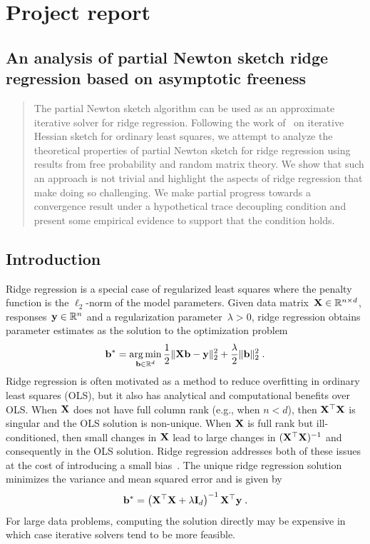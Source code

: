 

\section{Project report}

\subsection*{\centering An analysis of partial Newton sketch ridge regression based on asymptotic freeness}
\vspace{1em}

\begin{abstract}
The partial Newton sketch algorithm can be used as an approximate iterative solver for ridge regression. Following the work of~\citet{Lacotte:2020} on iterative Hessian sketch for ordinary least squares, we attempt to analyze the theoretical properties of partial Newton sketch for ridge regression using results from free probability and random matrix theory. We show that such an approach is not trivial and highlight the aspects of ridge regression that make doing so challenging. We make partial progress towards a convergence result under a hypothetical trace decoupling condition and present some empirical evidence to support that the condition holds.
\end{abstract}


\subsection{Introduction}

Ridge regression is a special case of regularized least squares where the penalty function is the $\ell_2$-norm of the model parameters. Given data matrix~$\mathbf{X}\in\mathbb{R}^{n\times d}$, responses~$\mathbf{y}\in\mathbb{R}^n$ and a regularization parameter~$\lambda>0$, ridge regression obtains parameter estimates as the solution to the optimization problem
\[
\mathbf{b}^* = \operatorname*{arg\,min}_{\mathbf{b}\in\mathbb{R}^d} \frac{1}{2}\|\mathbf{X}\mathbf{b}-\mathbf{y}\|_2^2 + \frac{\lambda}{2}\|\mathbf{b}\|_2^2 \;.
\]
Ridge regression is often motivated as a method to reduce overfitting in ordinary least squares (OLS), but it also has analytical and computational benefits over OLS. When $\mathbf{X}$ does not have full column rank (e.g., when $n< d$), then $\mathbf{X}^\top\mathbf{X}$ is singular and the OLS solution is non-unique. When $\mathbf{X}$ is full rank but ill-conditioned, then small changes in $\mathbf{X}$ lead to large changes in $(\mathbf{X}^\top\mathbf{X})^{-1}$ and consequently in the OLS solution. Ridge regression addresses both of these issues at the cost of introducing a small bias~\citep{Chowdhury:2018}. The unique ridge regression solution minimizes the variance and mean squared error and is given by
\[
\mathbf{b}^* = \left(\mathbf{X}^\top\mathbf{X} + \lambda\mathbf{I}_d\right)^{-1}\mathbf{X}^\top\mathbf{y} \;.
\]
For large data problems, computing the solution directly may be expensive in which case iterative solvers tend to be more feasible.
\\

